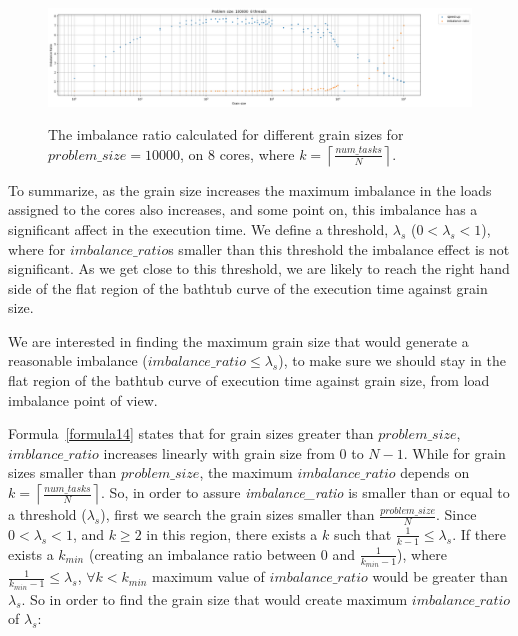 \vspace{\baselineskip}	
\begin{figure}[H]
	\centering
	{\includegraphics[scale=.3]{images/hpx_for_loop/w_c_speedup.png}}
	\caption{The imbalance ratio calculated for different grain sizes for $problem\_size=10000$, on 8 cores, where $k=\left\lceil{\frac{num\_{tasks}}{N}}\right \rceil$.}\label{fig37}		
\end{figure}


To summarize, as the grain size increases the maximum imbalance in the loads assigned to the cores also increases, and some point on, this imbalance has a significant affect in the execution time. We define a threshold, $\lambda_s$ ($0<\lambda_s<1$), where for $imbalance\_{ratio}$s smaller than this threshold the imbalance effect is not significant. As we get close to this threshold, we are likely to reach the right hand side of the flat region of the bathtub curve of the execution time against grain size. 


We are interested in finding the maximum grain size that would generate a reasonable imbalance ($imbalance\_{ratio}\leq{\lambda_s}$), to make sure we should stay in the flat region of the bathtub curve of execution time against grain size, from load imbalance point of view.  

Formula~\ref{formula14} states that for grain sizes greater than $problem\_{size}$, $imblance\_{ratio}$ increases linearly with grain size from $0$ to $N-1$. While for grain sizes smaller than $problem\_{size}$, the maximum $imbalance\_{ratio}$ depends on $k=\left\lceil{\frac{num\_{tasks}}{N}}\right\rceil$. So, in order to assure \emph{imbalance\_{ratio}} is smaller than or equal to a threshold ($\lambda_s$), first we search the grain sizes smaller than $\frac{problem\_{size}}{N}$. Since $0<\lambda_s<1$, and $k\geq2$ in this region, there exists a $k$ such that $\frac{1}{k-1}\leq\lambda_s$.    
If there exists a $k_{min}$ (creating an imbalance ratio between $0$ and $\frac{1}{k_{min}-1}$), where $\frac{1}{k_{min}-1}\leq{\lambda_s}$, $\forall k<k_{min}$ maximum value of $imbalance\_{ratio}$ would be greater than $\lambda_s$. So in order to find the grain size that would create maximum $imbalance\_{ratio}$ of $\lambda_s$:



